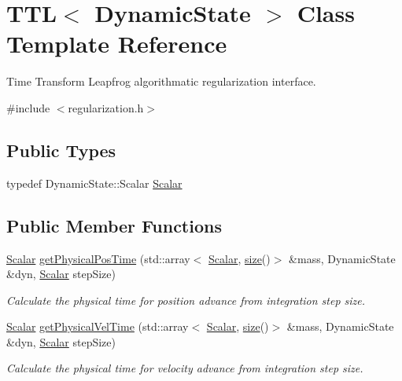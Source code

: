 \hypertarget{class_t_t_l}{}\section{T\+TL$<$ Dynamic\+State $>$ Class Template Reference}
\label{class_t_t_l}


Time Transform Leapfrog algorithmatic regularization interface.  




{\ttfamily \#include $<$regularization.\+h$>$}

\subsection*{Public Types}
\begin{DoxyCompactItemize}
\item 
typedef Dynamic\+State\+::\+Scalar \mbox{\hyperlink{class_t_t_l_a7eb23a1fca47fc7b81e69cbd948059e9}{Scalar}}
\end{DoxyCompactItemize}
\subsection*{Public Member Functions}
\begin{DoxyCompactItemize}
\item 
\mbox{\hyperlink{class_t_t_l_a7eb23a1fca47fc7b81e69cbd948059e9}{Scalar}} \mbox{\hyperlink{class_t_t_l_aedc11109f6e3cfd30203abb74cd906a2}{get\+Physical\+Pos\+Time}} (std\+::array$<$ \mbox{\hyperlink{class_t_t_l_a7eb23a1fca47fc7b81e69cbd948059e9}{Scalar}}, \mbox{\hyperlink{class_t_t_l_afec8947e7c6c18561be42e3dea30a04d}{size}}()$>$ \&mass, Dynamic\+State \&dyn, \mbox{\hyperlink{class_t_t_l_a7eb23a1fca47fc7b81e69cbd948059e9}{Scalar}} step\+Size)
\begin{DoxyCompactList}\small\item\em Calculate the physical time for position advance from integration step size. \end{DoxyCompactList}\item 
\mbox{\hyperlink{class_t_t_l_a7eb23a1fca47fc7b81e69cbd948059e9}{Scalar}} \mbox{\hyperlink{class_t_t_l_aceaf494a8e6af473703027241d4eaa41}{get\+Physical\+Vel\+Time}} (std\+::array$<$ \mbox{\hyperlink{class_t_t_l_a7eb23a1fca47fc7b81e69cbd948059e9}{Scalar}}, \mbox{\hyperlink{class_t_t_l_afec8947e7c6c18561be42e3dea30a04d}{size}}()$>$ \&mass, Dynamic\+State \&dyn, \mbox{\hyperlink{class_t_t_l_a7eb23a1fca47fc7b81e69cbd948059e9}{Scalar}} step\+Size)
\begin{DoxyCompactList}\small\item\em Calculate the physical time for velocity advance from integration step size. \end{DoxyCompactList}\end{DoxyCompactItemize}
